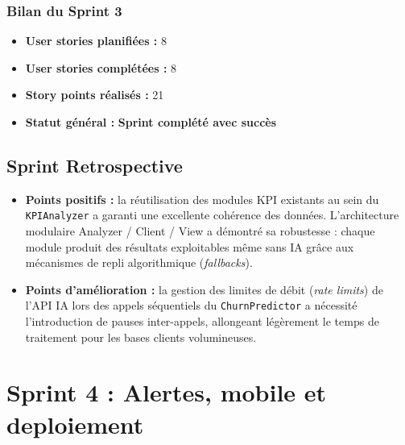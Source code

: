 \documentclass[a4paper,12pt]{report}
\begin{document}
\subsubsection*{Bilan du Sprint 3}
 
\begin{itemize}
    \item \textbf{User stories planifiées :} 8
    \item \textbf{User stories complétées :} 8
    \item \textbf{Story points réalisés :} 21
    \item \textbf{Statut général :}
    \textcolor{faible}{\textbf{Sprint complété avec succès}}
\end{itemize}
 
\subsection{Sprint Retrospective}
 
\begin{itemize}
    \item \textbf{Points positifs :} la réutilisation des modules KPI
    existants au sein du \texttt{KPIAnalyzer} a garanti une excellente
    cohérence des données. L'architecture modulaire Analyzer / Client /
    View a démontré sa robustesse : chaque module produit des résultats
    exploitables même sans IA grâce aux mécanismes de repli algorithmique
    (\textit{fallbacks}).
 
    \item \textbf{Points d'amélioration :} la gestion des limites de
    débit (\textit{rate limits}) de l'API IA lors des appels séquentiels
    du \texttt{ChurnPredictor} a nécessité l'introduction de pauses
    inter-appels, allongeant légèrement le temps de traitement pour les
    bases clients volumineuses.
\end{itemize}
 
 
 
\section{Sprint 4 : Alertes, mobile et deploiement}
\end{document}
